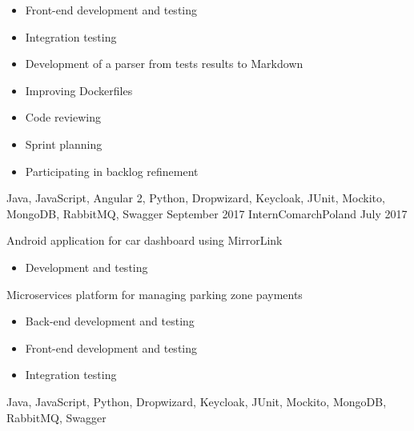 \begin{experiences}
{\begin{itemize}
                            \item Front-end development and testing
                            \item Integration testing
                            \item Development of a parser from tests results to Markdown
                            \item Improving Dockerfiles
                            \item Code reviewing
                            \item Sprint planning
                            \item Participating in backlog refinement
                        \end{itemize}
                    }
                    {Java, JavaScript, Angular 2, Python, Dropwizard, Keycloak, JUnit, Mockito, MongoDB, RabbitMQ, Swagger}
  \emptySeparator
  \experience
  {September 2017}       {Intern}{Comarch}{Poland}
  {July 2017}      {
                        Android application for car dashboard using MirrorLink
                        \begin{itemize}
                            \item Development and testing
                        \end{itemize}
                        Microservices platform for managing parking zone payments
                        \begin{itemize}
                            \item Back-end development and testing
                            \item Front-end development and testing
                            \item Integration testing
                        \end{itemize}
                    }
                    {Java, JavaScript, Python, Dropwizard, Keycloak, JUnit, Mockito, MongoDB, RabbitMQ, Swagger}
\end{experiences}
